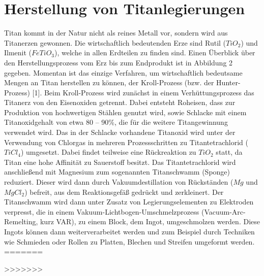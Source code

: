 \section{Herstellung von Titanlegierungen}
Titan kommt in der Natur nicht als reines Metall vor, sondern wird aus Titanerzen gewonnen. Die wirtschaftlich bedeutenden Erze sind Rutil ($TiO_2$) und Ilmenit ($FeTiO_3$), welche in allen Erdteilen zu finden sind. Einen Überblick über den Herstellungsprozess vom Erz bis zum Endprodukt ist in Abbildung 2 gegeben. Momentan ist das einzige Verfahren, um wirtschaftlich bedeutsame Mengen an Titan herstellen zu können, der Kroll-Prozess (bzw. der Hunter-Prozess) [1]. Beim Kroll-Prozess wird zunächst in einem Verhüttungsprozess das Titanerz von den Eisenoxiden getrennt. Dabei entsteht Roheisen, dass zur Produktion von hochwertigen Stählen genutzt wird, 
sowie Schlacke mit einem Titanoxidgehalt von etwa 80 -- 90\%, die für die weitere Titangewinnung verwendet wird. Das in der Schlacke vorhandene Titanoxid wird unter der Verwendung von Chlorgas in mehreren Prozessschritten zu Titantetrachlorid ($TiCl_4$) umgesetzt. Dabei findet teilweise eine Rückreaktion zu $TiO_2$ statt, da Titan eine hohe Affinität zu Sauerstoff besitzt. Das Titantetrachlorid wird anschließend mit Magnesium  zum sogenannten Titanschwamm (Sponge) reduziert. Dieser wird dann durch Vakuumdestillation von Rückständen ($Mg$ und $MgCl_2$) befreit, aus dem Reaktionsgefäß gedrückt und zerkleinert. Der Titanschwamm wird dann unter Zusatz von Legierungselementen zu Elektroden verpresst, die in einem Vakuum-Lichtbogen-Umschmelzprozess (Vacuum-Arc-Remelting, kurz VAR), zu einem Block, dem Ingot, umgeschmolzen werden. Diese Ingots können dann weiterverarbeitet werden und zum Beispiel durch Techniken wie Schmieden oder Rollen zu Platten, Blechen und Streifen umgeformt werden. 
=======

>>>>>>>

